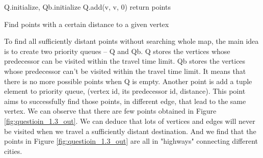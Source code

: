 \documentclass[titlepage,11pt,a4paper]{article}
\begin{document}
\begin{algorithm}[H]

 Q.initialize, Qb.initialize\;
 Q.add(v, v, 0)\;
 return points\;
 \caption{Find points with a certain distance to a given vertex}
\end{algorithm}
To find all sufficiently distant points without searching whole map, the main idea is to create two priority queues -- Q and Qb. Q stores the vertices whose predecessor can be visited within the travel time limit. Qb stores the vertices whose predecessor can't be visited within the travel time limit. It means that there is no more possible points when Q is empty. Another point is add a tuple element to priority queue, (vertex id, its predecessor id, distance). This point aims to successfully find those points, in different edge, that lead to the same vertex.
We can observe that there are few points obtained in Figure \ref{fig:questioin_1.3_out}. We can deduce that lots of vertices and edges will never be visited when we travel a sufficiently distant destination. And we find that the points in Figure \ref{fig:questioin_1.3_out} are all in "highways" connecting different cities.
\end{document}
